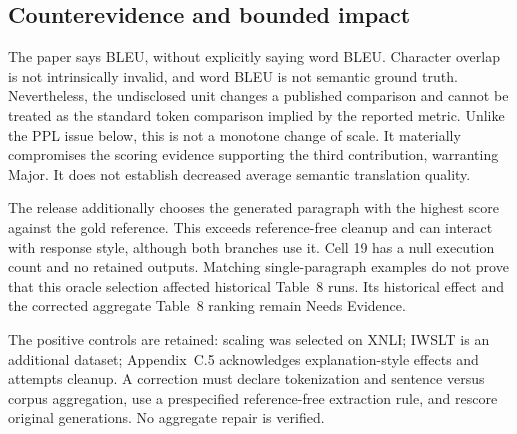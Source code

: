 \documentclass[10pt]{article}
\begin{document}
\subsection*{Counterevidence and bounded impact}
The paper says BLEU, without explicitly saying word BLEU. Character overlap is not intrinsically invalid, and word BLEU is not semantic ground truth. Nevertheless, the undisclosed unit changes a published comparison and cannot be treated as the standard token comparison implied by the reported metric. Unlike the PPL issue below, this is not a monotone change of scale. It materially compromises the scoring evidence supporting the third contribution, warranting Major. It does not establish decreased average semantic translation quality.\par
The release additionally chooses the generated paragraph with the highest score against the gold reference. This exceeds reference-free cleanup and can interact with response style, although both branches use it. Cell 19 has a null execution count and no retained outputs. Matching single-paragraph examples do not prove that this oracle selection affected historical Table 8 runs. Its historical effect and the corrected aggregate Table 8 ranking remain Needs Evidence.\par
The positive controls are retained: scaling was selected on XNLI; IWSLT is an additional dataset; Appendix C.5 acknowledges explanation-style effects and attempts cleanup. A correction must declare tokenization and sentence versus corpus aggregation, use a prespecified reference-free extraction rule, and rescore original generations. No aggregate repair is verified.\par
\end{document}
